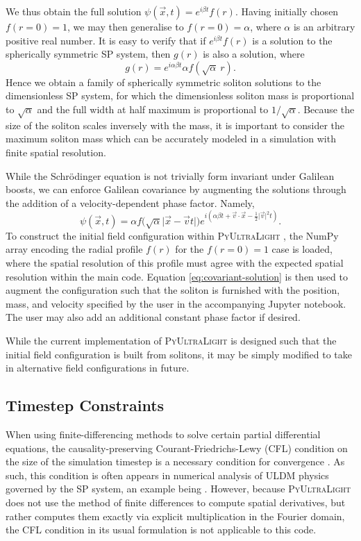 \documentclass[a4paper,11pt]{article}
\newcommand{\PyUltraLight}{\textsc{PyUltraLight }}
\begin{document}
We thus obtain the full solution $\psi(\vec{x},t)=e^{i\beta t}f(r)$.
Having initially chosen $f(r=0)=1$, we may then generalise to $f(r=0)=\alpha$, where $\alpha$ is an arbitrary positive real number. It is easy to verify that if $e^{i\beta t}f(r)$ is a solution to the spherically symmetric SP system, then $g(r)$ is also a solution, where
\begin{equation}
    g(r)=e^{i\alpha\beta t}\alpha f(\sqrt{\alpha}\ r).
\end{equation}
Hence we obtain a family of spherically symmetric soliton solutions to the dimensionless SP system, for which the dimensionless soliton mass is proportional to $\sqrt{\alpha}$ and the full width at half maximum is proportional to $1/\sqrt{\alpha}$. Because the size of the soliton scales inversely with the mass, it is important to consider the maximum soliton mass which can be accurately modeled in a simulation with finite spatial resolution. 

While the Schr{\"o}dinger equation is not trivially form invariant under Galilean boosts, we can enforce Galilean covariance by augmenting the solutions through the addition of a velocity-dependent phase factor. Namely,
\begin{equation}\label{eq:covariant-solution}
    \psi(\vec{x},t)=\alpha f\big(\sqrt{\alpha}\vert\vec{x}-\vec{v}t\vert\big)e^{i\left(\alpha\beta t+\vec{v}\cdot\vec{x}-\frac{1}{2}\vert\vec{v}\vert^2t\right)}.
\end{equation}
To construct the initial field configuration within \PyUltraLight, the NumPy array encoding the radial profile $f(r)$ for the $f(r=0)=1$ case is loaded, where the spatial resolution of this profile must agree with the expected spatial resolution within the main code. Equation \ref{eq:covariant-solution} is then used to augment the configuration such that the soliton is furnished with the position, mass, and velocity specified by the user in the accompanying Jupyter notebook. The user may also add an additional constant phase factor if desired.

While the current implementation of \PyUltraLight is designed such that the initial field configuration is built from solitons, it may be simply modified to take in alternative field configurations in future.  

\subsection{Timestep Constraints}

When using finite-differencing methods to solve certain partial differential equations, the causality-preserving Courant-Friedrichs-Lewy (CFL) condition on the size of the simulation timestep is a necessary condition for convergence \cite{Ajaib2013}. As such, this condition is often appears in numerical analysis of ULDM physics governed by the SP system, an example being \cite{Schwabe2016}. However, because \PyUltraLight does not use the method of finite differences to compute spatial derivatives, but rather computes them exactly via explicit multiplication in the Fourier domain, the CFL condition in its usual formulation is not applicable to this code. 
\end{document}
